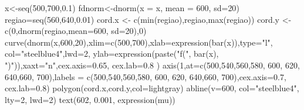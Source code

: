\documentclass[
  letterpaper,
  DIV=11,
  numbers=noendperiod]{scrreprt}
\newenvironment{Shaded}{\begin{snugshade}}{\end{snugshade}}
\newcommand{\AttributeTok}[1]{\textcolor[rgb]{0.40,0.45,0.13}{#1}}
\newcommand{\DecValTok}[1]{\textcolor[rgb]{0.68,0.00,0.00}{#1}}
\newcommand{\FloatTok}[1]{\textcolor[rgb]{0.68,0.00,0.00}{#1}}
\newcommand{\FunctionTok}[1]{\textcolor[rgb]{0.28,0.35,0.67}{#1}}
\newcommand{\NormalTok}[1]{\textcolor[rgb]{0.00,0.23,0.31}{#1}}
\newcommand{\OtherTok}[1]{\textcolor[rgb]{0.00,0.23,0.31}{#1}}
\newcommand{\StringTok}[1]{\textcolor[rgb]{0.13,0.47,0.30}{#1}}
\begin{document}
\begin{Shaded}
\begin{Highlighting}[]
\NormalTok{x}\OtherTok{\textless{}{-}}\FunctionTok{seq}\NormalTok{(}\DecValTok{500}\NormalTok{,}\DecValTok{700}\NormalTok{,}\FloatTok{0.1}\NormalTok{) }
\NormalTok{fdnorm}\OtherTok{\textless{}{-}}\FunctionTok{dnorm}\NormalTok{(}\AttributeTok{x =}\NormalTok{ x, }\AttributeTok{mean =} \DecValTok{600}\NormalTok{, }\AttributeTok{sd=}\DecValTok{20}\NormalTok{)   }
\NormalTok{regiao}\OtherTok{=}\FunctionTok{seq}\NormalTok{(}\DecValTok{560}\NormalTok{,}\DecValTok{640}\NormalTok{,}\FloatTok{0.01}\NormalTok{)}
\NormalTok{cord.x }\OtherTok{\textless{}{-}} \FunctionTok{c}\NormalTok{(}\FunctionTok{min}\NormalTok{(regiao),regiao,}\FunctionTok{max}\NormalTok{(regiao))}
\NormalTok{cord.y }\OtherTok{\textless{}{-}} \FunctionTok{c}\NormalTok{(}\DecValTok{0}\NormalTok{,}\FunctionTok{dnorm}\NormalTok{(regiao,}\AttributeTok{mean=}\DecValTok{600}\NormalTok{, }\AttributeTok{sd=}\DecValTok{20}\NormalTok{),}\DecValTok{0}\NormalTok{) }
\FunctionTok{curve}\NormalTok{(}\FunctionTok{dnorm}\NormalTok{(x,}\DecValTok{600}\NormalTok{,}\DecValTok{20}\NormalTok{),}\AttributeTok{xlim=}\FunctionTok{c}\NormalTok{(}\DecValTok{500}\NormalTok{,}\DecValTok{700}\NormalTok{),}\AttributeTok{xlab=}\FunctionTok{expression}\NormalTok{(}\FunctionTok{bar}\NormalTok{(x)),}\AttributeTok{type=}\StringTok{"l"}\NormalTok{,}
      \AttributeTok{col=}\StringTok{"steelblue4"}\NormalTok{,}\AttributeTok{lwd=}\DecValTok{2}\NormalTok{, }\AttributeTok{ylab=}\FunctionTok{expression}\NormalTok{(}\FunctionTok{paste}\NormalTok{(}\StringTok{"f("}\NormalTok{, }\FunctionTok{bar}\NormalTok{(x),}
      \StringTok{")"}\NormalTok{)),}\AttributeTok{xaxt=}\StringTok{"n"}\NormalTok{,}\AttributeTok{cex.axis=}\FloatTok{0.65}\NormalTok{, }\AttributeTok{cex.lab=}\FloatTok{0.8}\NormalTok{ ) }
\FunctionTok{axis}\NormalTok{(}\DecValTok{1}\NormalTok{,}\AttributeTok{at=}\FunctionTok{c}\NormalTok{(}\DecValTok{500}\NormalTok{,}\DecValTok{540}\NormalTok{,}\DecValTok{560}\NormalTok{,}\DecValTok{580}\NormalTok{, }\DecValTok{600}\NormalTok{, }\DecValTok{620}\NormalTok{, }\DecValTok{640}\NormalTok{,}\DecValTok{660}\NormalTok{, }\DecValTok{700}\NormalTok{),}\AttributeTok{labels =}
       \FunctionTok{c}\NormalTok{(}\DecValTok{500}\NormalTok{,}\DecValTok{540}\NormalTok{,}\DecValTok{560}\NormalTok{,}\DecValTok{580}\NormalTok{, }\DecValTok{600}\NormalTok{, }\DecValTok{620}\NormalTok{, }\DecValTok{640}\NormalTok{,}\DecValTok{660}\NormalTok{, }\DecValTok{700}\NormalTok{),}\AttributeTok{cex.axis=}\FloatTok{0.7}\NormalTok{, }\AttributeTok{cex.lab=}\FloatTok{0.8}\NormalTok{) }
\FunctionTok{polygon}\NormalTok{(cord.x,cord.y,}\AttributeTok{col=}\StringTok{\textquotesingle{}lightgray\textquotesingle{}}\NormalTok{)}
\FunctionTok{abline}\NormalTok{(}\AttributeTok{v=}\DecValTok{600}\NormalTok{, }\AttributeTok{col=}\StringTok{"steelblue4"}\NormalTok{, }\AttributeTok{lty=}\DecValTok{2}\NormalTok{, }\AttributeTok{lwd=}\DecValTok{2}\NormalTok{)}
\FunctionTok{text}\NormalTok{(}\DecValTok{602}\NormalTok{, }\FloatTok{0.001}\NormalTok{, }\FunctionTok{expression}\NormalTok{(mu))}
\end{Highlighting}
\end{Shaded}
\end{document}
